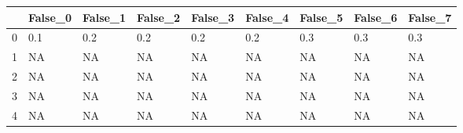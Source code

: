 \begin{tabular}{lllllllll}
\toprule
{} & False\_0 & False\_1 & False\_2 & False\_3 & False\_4 & False\_5 & False\_6 & False\_7 \\ \hline
\midrule
0 &     0.1 &     0.2 &     0.2 &     0.2 &     0.2 &     0.3 &     0.3 &     0.3 \\ \hline
1 &      NA &      NA &      NA &      NA &      NA &      NA &      NA &      NA \\ \hline
2 &      NA &      NA &      NA &      NA &      NA &      NA &      NA &      NA \\ \hline
3 &      NA &      NA &      NA &      NA &      NA &      NA &      NA &      NA \\ \hline
4 &      NA &      NA &      NA &      NA &      NA &      NA &      NA &      NA \\ \hline
\bottomrule
\end{tabular}
